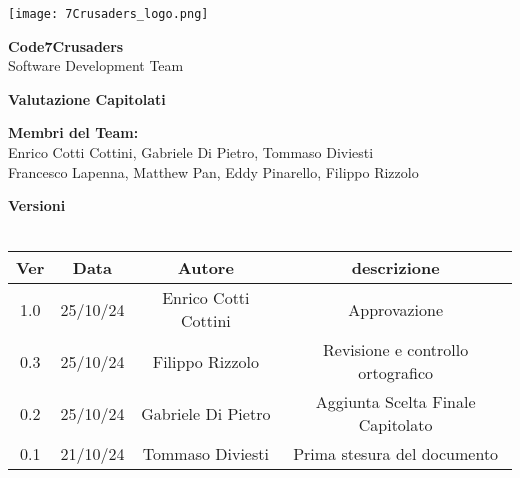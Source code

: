 \documentclass{article}
\begin{document}
\begin{titlepage}


    \centering
    \vspace*{2cm}
    
    \texttt{[image: 7Crusaders\_logo.png]} %
    \vspace{1cm}
    
    {\Huge \textbf{Code7Crusaders}}\\
    \vspace{0.5cm}
    {\Large Software Development Team}\\
    \vspace{2cm}
    
    {\large \textbf{Valutazione Capitolati}}\\
    \vspace{5cm}

    \textbf{Membri del Team:}\\
    Enrico Cotti Cottini, Gabriele Di Pietro, Tommaso Diviesti \\
    Francesco Lapenna, Matthew Pan, Eddy Pinarello, Filippo Rizzolo \\
    \vspace{0.5cm}
    
    \vspace{1cm}
\end{titlepage}

\newpage
\begin{center}
    \textbf{Versioni}
    \\
    \\
    \begin{tabular}{|c|c|c|c|}
        \hline
        \textbf{Ver} & \textbf{Data} & \textbf{Autore} & \textbf{descrizione}\\
        \hline
        1.0 & 25/10/24 & Enrico Cotti Cottini & Approvazione \\
        0.3 & 25/10/24 & Filippo Rizzolo & Revisione e controllo ortografico \\
        0.2 & 25/10/24 & Gabriele Di Pietro & Aggiunta Scelta Finale Capitolato \\
        0.1 & 21/10/24 & Tommaso Diviesti & Prima stesura del documento \\
        \hline
    \end{tabular}
\end{center}
\newpage
\end{document}
